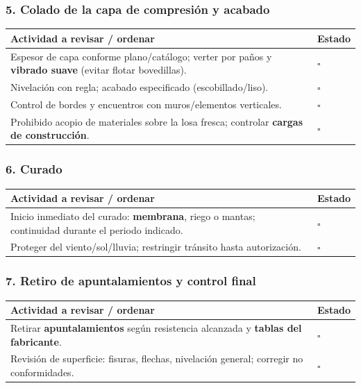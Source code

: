 \documentclass[12pt]{article}
\newcommand{\cbox}{\(\square\)}
\renewcommand{\cbox}{\(\square\)} %
\begin{document}
 \subsubsection*{5. Colado de la capa de compresión y acabado}
 \begin{tabularx}{\linewidth}{>{\raggedright\arraybackslash}p{0.93\linewidth} >{\centering\arraybackslash}m{0.07\linewidth}}
 	\toprule
 	\textbf{Actividad a revisar / ordenar} & \textbf{Estado}\\
 	\midrule
 	Espesor de capa conforme plano/catálogo; verter por paños y \textbf{vibrado suave} (evitar flotar bovedillas). & \cbox \\
 	Nivelación con regla; acabado especificado (escobillado/liso). & \cbox \\
 	Control de bordes y encuentros con muros/elementos verticales. & \cbox \\
 	Prohibido acopio de materiales sobre la losa fresca; controlar \textbf{cargas de construcción}. & \cbox \\
 	\bottomrule
 \end{tabularx}
 
 \subsubsection*{6. Curado}
 \begin{tabularx}{\linewidth}{>{\raggedright\arraybackslash}p{0.93\linewidth} >{\centering\arraybackslash}m{0.07\linewidth}}
 	\toprule
 	\textbf{Actividad a revisar / ordenar} & \textbf{Estado}\\
 	\midrule
 	Inicio inmediato del curado: \textbf{membrana}, riego o mantas; continuidad durante el periodo indicado. & \cbox \\
 	Proteger del viento/sol/lluvia; restringir tránsito hasta autorización. & \cbox \\
 	\bottomrule
 \end{tabularx}
 
 \subsubsection*{7. Retiro de apuntalamientos y control final}
 \begin{tabularx}{\linewidth}{>{\raggedright\arraybackslash}p{0.93\linewidth} >{\centering\arraybackslash}m{0.07\linewidth}}
 	\toprule
 	\textbf{Actividad a revisar / ordenar} & \textbf{Estado}\\
 	\midrule
 	Retirar \textbf{apuntalamientos} según resistencia alcanzada y \textbf{tablas del fabricante}. & \cbox \\
 	Revisión de superficie: fisuras, flechas, nivelación general; corregir no conformidades. & \cbox \\
 	\bottomrule
 \end{tabularx}
 
\end{document}
